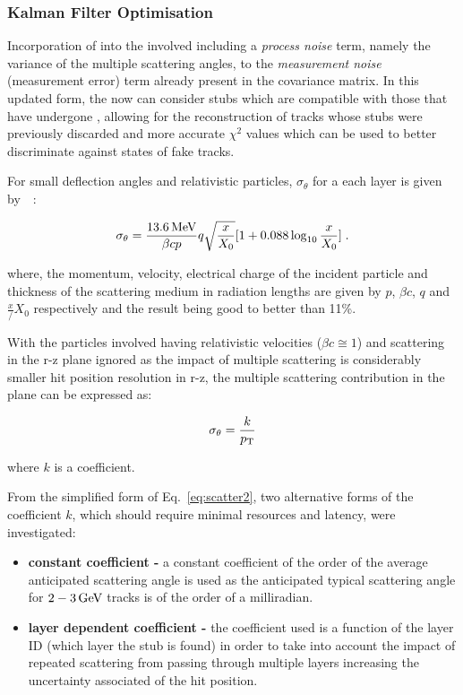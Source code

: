 \subsubsection{Kalman Filter Optimisation}\label{subsubsec:lowPtOptKF}
Incorporation of \MS into the \KF involved including a \emph{process noise} term, namely the variance of the multiple scattering angles, to the \emph{measurement noise} (\ie measurement error) term already present in the \KF covariance matrix.
In this updated form, the \KF now can consider stubs which are compatible with those that have undergone \MS, allowing for the reconstruction of tracks whose stubs were previously discarded and more accurate $\chi^{2}$ values which can be used to better discriminate against states of fake tracks.

For small deflection angles and relativistic particles, $\sigma_{\theta}$ for a each layer is given by~\cite{Lynch:1990sq}~:

\begin{equation}
\sigma_{\theta} = \frac{13.6\,\text{Me\hspace{-.08em}V}}{\beta c p} q \sqrt{\frac{x}{X_{0}}} [1 + 0.088 \log_{10}{\frac{x}{X_{0}}}]  \;.
\label{eq:scatter1}
\end{equation}

where, the momentum, velocity, electrical charge of the incident particle and thickness of the scattering medium in radiation lengths are given by $p$, $\beta c$, $q$ and $\frac{x}/{X_{0}}$ respectively and the result being good to better than 11\%.

With the particles involved having relativistic velocities (\ie $\beta c \cong 1$) and scattering in the r-z plane ignored as the impact of multiple scattering is considerably smaller hit position resolution in r-z, the multiple scattering contribution in the \rphi plane can be expressed as:

\begin{equation}
\sigma_{\theta} = \frac{k}{p_{\mathrm{T}}}
\label{eq:scatter2}
\end{equation}

where $k$ is a coefficient.

From the simplified form of Eq.~\ref{eq:scatter2}, two alternative forms of the coefficient $k$, which should require minimal resources and latency, were investigated:

\begin{itemize}
\item \textbf{constant coefficient - } a constant coefficient of the order of the average anticipated scattering angle is used as the anticipated typical scattering angle for $2-3\,\text{Ge\hspace{-.08em}V}$ tracks is of the order of a milliradian.
\item \textbf{layer dependent coefficient -} the coefficient used is a function of the layer ID (\ie which layer the stub is found) in order to take into account the impact of repeated scattering from passing through multiple layers increasing the uncertainty associated of the hit position.
\end{itemize}

